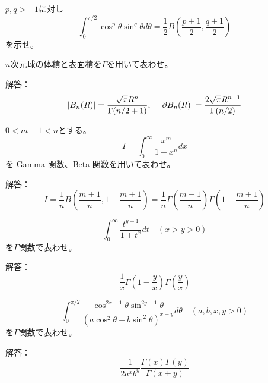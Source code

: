 \documentclass[report]{jlreq}
\begin{document}
\begin{problem}
    $p, q > -1$に対し
    \begin{equation}
        \int_0^{\pi/2} \cos^p \theta \sin^q \theta d\theta
            = \frac{1}{2} B\!\left(\frac{p+1}{2}, \frac{q+1}{2}\right)
    \end{equation}
    を示せ。
\end{problem}

\begin{problem}
    $n$次元球の体積と表面積を$\Gamma$を用いて表わせ。

    解答：
    \begin{equation}
        |B_n(R)| = \frac{\sqrt{\pi} R^n}{\Gamma(n/2 + 1)},\quad
        |\partial B_n(R)| = \frac{2 \sqrt{\pi} R^{n-1}}{\Gamma(n/2)}
    \end{equation}
\end{problem}

\begin{problem}
    $0 < m+1 < n$とする。
    \begin{equation}
        I = \int_0^\infty \frac{x^m}{1 + x^n} dx
    \end{equation}
    を Gamma 関数、Beta 関数を用いて表わせ。

    解答：
    \begin{equation}
        I = \frac{1}{n} B\left( \frac{m+1}{n}, 1 - \frac{m+1}{n} \right)
            = \frac{1}{n} \Gamma\left(\frac{m+1}{n}\right) \Gamma\left(1 - \frac{m+1}{n}\right)
    \end{equation}
\end{problem}

\begin{problem}
    \begin{equation}
        \int_0^\infty \frac{t^{y-1}}{1+t^x} dt \quad (x > y > 0)
    \end{equation}
    を$\Gamma$関数で表わせ。

    解答：
    \begin{equation}
        \frac{1}{x} \Gamma\left(1 - \frac{y}{x}\right) \Gamma\left(\frac{y}{x}\right)
    \end{equation}
\end{problem}

\begin{problem}
    \begin{equation}
        \int_0^{\pi/2} \frac{\cos^{2x-1} \theta \sin^{2y - 1} \theta}
            {(a \cos^2\theta + b \sin^2\theta)^{x+y}} d\theta \quad (a, b, x, y > 0)
    \end{equation}
    を$\Gamma$関数で表わせ。

    解答：
    \begin{equation}
        \frac{1}{2 a^x b^y} \frac{\Gamma(x) \Gamma(y)}{\Gamma(x + y)}
    \end{equation}
\end{problem}
\end{document}
